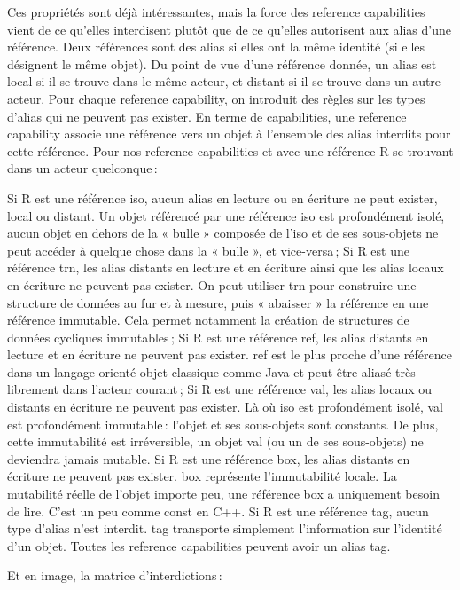 \documentclass[11pt, oneside]{article}   	%
\begin{document}
Ces propriétés sont déjà intéressantes, mais la force des reference capabilities vient de ce qu’elles interdisent plutôt que de ce qu’elles autorisent aux alias d’une référence. Deux références sont des alias si elles ont la même identité (si elles désignent le même objet). Du point de vue d’une référence donnée, un alias est local si il se trouve dans le même acteur, et distant si il se trouve dans un autre acteur. Pour chaque reference capability, on introduit des règles sur les types d’alias qui ne peuvent pas exister. En terme de capabilities, une reference capability associe une référence vers un objet à l’ensemble des alias interdits pour cette référence. Pour nos reference capabilities et avec une référence R se trouvant dans un acteur quelconque :

    Si R est une référence iso, aucun alias en lecture ou en écriture ne peut exister, local ou distant. Un objet référencé par une référence iso est profondément isolé, aucun objet en dehors de la « bulle » composée de l’iso et de ses sous-objets ne peut accéder à quelque chose dans la « bulle », et vice-versa ;
    Si R est une référence trn, les alias distants en lecture et en écriture ainsi que les alias locaux en écriture ne peuvent pas exister. On peut utiliser trn pour construire une structure de données au fur et à mesure, puis « abaisser » la référence en une référence immutable. Cela permet notamment la création de structures de données cycliques immutables ;
    Si R est une référence ref, les alias distants en lecture et en écriture ne peuvent pas exister. ref est le plus proche d’une référence dans un langage orienté objet classique comme Java et peut être aliasé très librement dans l’acteur courant ;
    Si R est une référence val, les alias locaux ou distants en écriture ne peuvent pas exister. Là où iso est profondément isolé, val est profondément immutable : l’objet et ses sous-objets sont constants. De plus, cette immutabilité est irréversible, un objet val (ou un de ses sous-objets) ne deviendra jamais mutable.
    Si R est une référence box, les alias distants en écriture ne peuvent pas exister. box représente l’immutabilité locale. La mutabilité réelle de l’objet importe peu, une référence box a uniquement besoin de lire. C’est un peu comme const en C++.
    Si R est une référence tag, aucun type d’alias n’est interdit. tag transporte simplement l’information sur l’identité d’un objet. Toutes les reference capabilities peuvent avoir un alias tag.

Et en image, la matrice d’interdictions :
	
\end{document}
